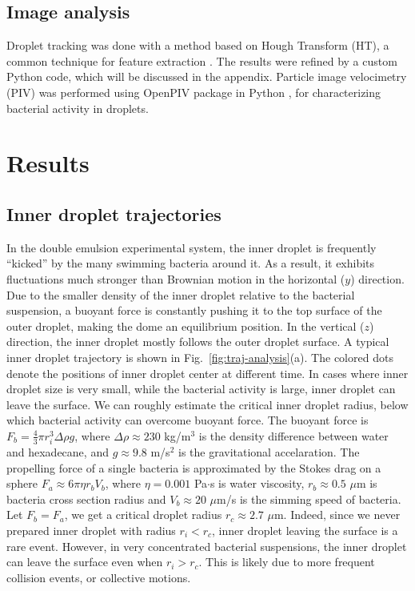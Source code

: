 \documentclass[%
10pt,
superscriptaddress,
twocolumn,
 amsmath,amssymb,
 aps,prx,
]{revtex4-2}
\begin{document}
\subsection{Image analysis}

Droplet tracking was done with a method based on Hough Transform (HT), a common technique for feature extraction \cite{Stockman2001}. 
The results were refined by a custom Python code, which will be discussed in the appendix.
Particle image velocimetry (PIV) was performed using OpenPIV package in Python \cite{OpenPIV}, for characterizing bacterial activity in droplets.


\section{Results}
\subsection{Inner droplet trajectories}

In the double emulsion experimental system, the inner droplet is frequently ``kicked'' by the many swimming bacteria around it.
As a result, it exhibits fluctuations much stronger than Brownian motion in the horizontal ($y$) direction.
Due to the smaller density of the inner droplet relative to the bacterial suspension, a buoyant force is constantly pushing it to the top surface of the outer droplet, making the dome an equilibrium position.
In the vertical ($z$) direction, the inner droplet mostly follows the outer droplet surface.
A typical inner droplet trajectory is shown in Fig.~\ref{fig:traj-analysis}(a).
The colored dots denote the positions of inner droplet center at different time.
In cases where inner droplet size is very small, while the bacterial activity is large, inner droplet can leave the surface.
We can roughly estimate the critical inner droplet radius, below which bacterial activity can overcome buoyant force.
The buoyant force is $F_b = \frac{4}{3}\pi r_i^3\Delta\rho g$, where $\Delta\rho\approx 230$ kg/m$^3$ is the density difference between water and hexadecane, and $g\approx 9.8$ m/s$^2$ is the gravitational accelaration.
The propelling force of a single bacteria is approximated by the Stokes drag on a sphere $F_a \approx 6\pi\eta r_b V_b$, where $\eta=0.001$ Pa$\cdot$s is water viscosity, $r_b\approx 0.5$ $\mu$m is bacteria cross section radius and $V_b \approx 20$ $\mu$m/s is the simming speed of bacteria.
Let $F_b=F_a$, we get a critical droplet radius $r_c \approx 2.7$ $\mu$m.
Indeed, since we never prepared inner droplet with radius $r_i < r_c$, inner droplet leaving the surface is a rare event.
However, in very concentrated bacterial suspensions, the inner droplet can leave the surface even when $r_i > r_c$.
This is likely due to more frequent collision events, or collective motions.
\end{document}
